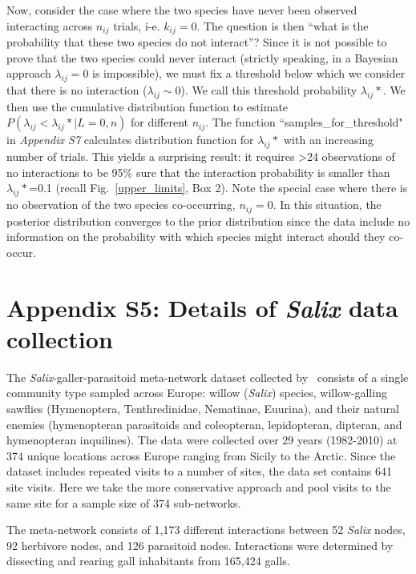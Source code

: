 \documentclass[12pt]{article}
\begin{document}
        Now, consider the case where the two species have never been observed interacting across $n_{ij}$ trials, i-e. $k_{ij}=0$. The question is then ``what is the probability that these two species do not interact''? Since it is not possible to prove that the two species could never interact (strictly speaking, in a Bayesian approach $\lambda_{ij}=0$ is impossible), we must fix a threshold below which we consider that there is no interaction ($\lambda_{ij}\sim0$). We call this threshold probability $\lambda_{ij}*$. We then use the cumulative distribution function to estimate $P(\lambda_{ij}<\lambda_{ij}*|L=0,n)$ for different $n_{ij}$. The function ``samples\_for\_threshold" in \emph{Appendix S7} calculates distribution function for $\lambda_{ij}*$ with an increasing number of trials. This yields a surprising result: it requires \textgreater24 observations of no interactions to be 95\% sure that the interaction probability is smaller than $\lambda_{ij}*$=0.1 (recall Fig.~\ref{upper_limits}, Box 2). Note the special case where there is no observation of the two species co-occurring, $n_{ij}= 0$.  In this situation, the posterior distribution converges to the prior distribution since the data include no information on the probability with which species might interact should they co-occur.

\clearpage

\section*{Appendix S5: Details of \emph{Salix} data collection}

      The \emph{Salix}-galler-parasitoid meta-network dataset collected 
      by~\citet{Kopelke2017} consists of a single community type sampled across 
      Europe: willow (\emph{Salix}) species, willow-galling sawflies (Hymenoptera, Tenthredinidae, Nematinae, Euurina), and their natural 
      enemies (hymenopteran parasitoids and coleopteran, lepidopteran, dipteran, 
      and hymenopteran inquilines). The data were collected over 29 years 
      (1982-2010) at 374 unique locations across Europe ranging from Sicily to 
      the Arctic. Since the dataset includes repeated visits to a number of sites, the data set 
      contains 641 site visits. Here we take the more conservative approach and pool visits to the same site for a sample size of 374 sub-networks.

      The meta-network consists of 1,173 different interactions 
      between 52 \emph{Salix} nodes, 92 herbivore nodes, and 126 parasitoid 
      nodes. Interactions were determined by dissecting and rearing gall 
      inhabitants from 165,424 galls. 
\end{document}
